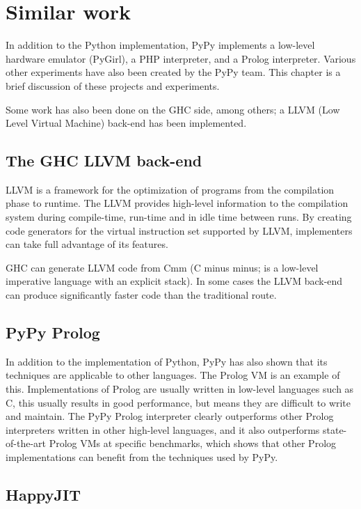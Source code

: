\chapter{Similar work}
\label{chap:similar}

In addition to the Python implementation, PyPy implements a low-level 
hardware emulator (PyGirl), a PHP interpreter, and a Prolog interpreter. 
Various other experiments have also been created by the PyPy team. This
chapter is a brief discussion of these projects and experiments. 

Some work has also been done on the GHC side, among others; a LLVM
(Low Level Virtual Machine) back-end has been implemented.

\section{The GHC LLVM back-end}

LLVM is a framework for the optimization of 
programs from the compilation phase to runtime. The LLVM provides high-level information 
to the compilation system during compile-time, run-time and in idle time between
runs. By creating code generators for the virtual instruction set supported by
LLVM, implementers can take full advantage of its features.
\cite{lattner2004llvm}

GHC can generate LLVM code from Cmm (C minus minus; is a low-level imperative
language with an explicit stack). In some cases the 
LLVM back-end can produce significantly faster code than the traditional route. 
\cite{marlow2012glasgow, terei2010llvm}

\section{PyPy Prolog}

In addition to the implementation of Python, PyPy has also shown that its techniques
are applicable to other languages. The Prolog VM is an example of this. Implementations
of Prolog are usually written in low-level languages such as C, this usually results in
good performance, but means they are difficult to write and maintain. The PyPy Prolog 
interpreter clearly outperforms other Prolog interpreters written in other high-level
languages, and it also outperforms state-of-the-art Prolog VMs at specific benchmarks,
which shows that other Prolog implementations can benefit from the techniques used by
PyPy. \cite{bolz2010towards}

\section{HappyJIT}

